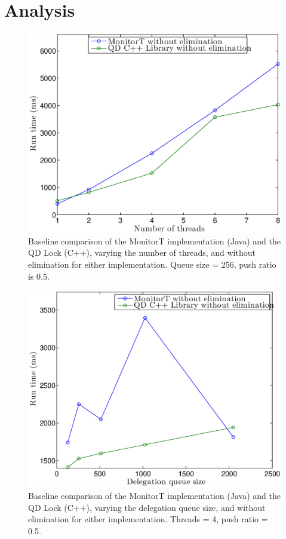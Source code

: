 \section{Analysis}

\begin{figure}[]
\centering
\includegraphics[width=.75\textwidth]{figs/00_TimeVsThreads_cppNoElim_javaNoElim.eps}
\caption[]{Baseline comparison of the MonitorT implementation (Java) and the QD Lock (C++), varying the number of threads, and without elimination for either implementation. Queue size = 256, push ratio is 0.5.}
\label{fig:fig00}
\end{figure}

\begin{figure}[]
\centering
\includegraphics[width=.75\textwidth]{figs/01_TimeVsQDsize_cppNoElim_javaNoElim.eps}
\caption[]{Baseline comparison of the MonitorT implementation (Java) and the QD Lock (C++), varying the delegation queue size, and without elimination for either implementation. Threads = 4, push ratio = 0.5.}
\label{fig:fig01}
\end{figure}

